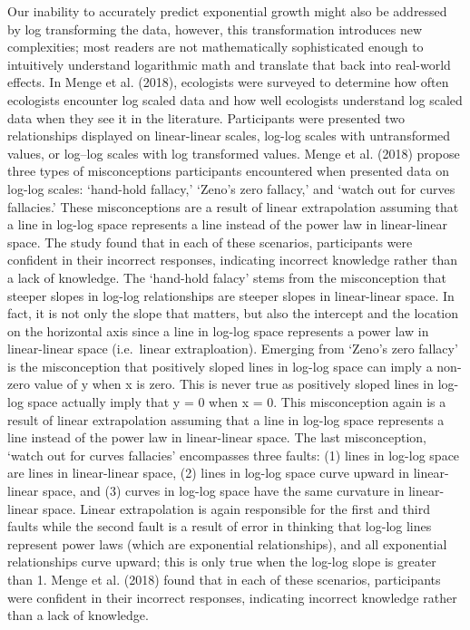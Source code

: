 \documentclass[print]{nuthesis}
\begin{document}
Our inability to accurately predict exponential growth might also be addressed by log transforming the data, however, this transformation introduces new complexities; most readers are not mathematically sophisticated enough to intuitively understand logarithmic math and translate that back into real-world effects.
In Menge et al. (2018), ecologists were surveyed to determine how often ecologists encounter log scaled data and how well ecologists understand log scaled data when they see it in the literature.
Participants were presented two relationships displayed on linear-linear scales, log-log scales with untransformed values, or log--log scales with log transformed values.
Menge et al. (2018) propose three types of misconceptions participants encountered when presented data on log-log scales: `hand-hold fallacy,' `Zeno's zero fallacy,' and `watch out for curves fallacies.' These misconceptions are a result of linear extrapolation assuming that a line in log-log space represents a line instead of the power law in linear-linear space. The study found that in each of these scenarios, participants were confident in their incorrect responses, indicating incorrect knowledge rather than a lack of knowledge. The `hand-hold falacy' stems from the misconception that steeper slopes in log-log relationships are steeper slopes in linear-linear space. In fact, it is not only the slope that matters, but also the intercept and the location on the horizontal axis since a line in log-log space represents a power law in linear-linear space (i.e.~linear extraploation). Emerging from `Zeno's zero fallacy' is the misconception that positively sloped lines in log-log space can imply a non-zero value of y when x is zero. This is never true as positively sloped lines in log-log space actually imply that y = 0 when x = 0. This misconception again is a result of linear extrapolation assuming that a line in log-log space represents a line instead of the power law in linear-linear space. The last misconception, `watch out for curves fallacies' encompasses three faults: (1) lines in log-log space are lines in linear-linear space, (2) lines in log-log space curve upward in linear-linear space, and (3) curves in log-log space have the same curvature in linear-linear space. Linear extrapolation is again responsible for the first and third faults while the second fault is a result of error in thinking that log-log lines represent power laws (which are exponential relationships), and all exponential relationships curve upward; this is only true when the log-log slope is greater than 1. Menge et al. (2018) found that in each of these scenarios, participants were confident in their incorrect responses, indicating incorrect knowledge rather than a lack of knowledge.
\end{document}
